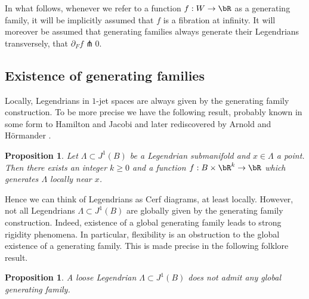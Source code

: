 \documentclass[JEP,XML,SOM,Unicode,NoFloatCountersInSection]{cedram}
\theoremstyle{plain}
\newtheorem{proposition}[theorem]{Proposition}
\theoremstyle{definition}
\begin{document}
In what follows, whenever we refer to a function $f:W \to \bR$ as a generating family, it will be implicitly assumed that $f$ is a fibration at infinity. It will moreover be assumed that generating families always generate their Legendrians transversely, \ie that $\partial_F f \pitchfork 0$.

\subsection{Existence of generating families}

Locally, Legendrians in $1$-jet spaces are always given by the generating family construction. To be more precise we have the following result, probably known in some form to Hamilton and Jacobi and later rediscovered by Arnold and Hörmander \cite{AGV85}.

\begin{proposition}
Let $\Lambda \subset J^1(B)$ be a Legendrian submanifold and $x \in \Lambda$ a point. Then there exists an integer $k \geq 0$ and a function $f: B \times \bR^k \to \bR$ which generates $\Lambda$ locally near $x$.
\end{proposition}

Hence we can think of Legendrians as Cerf diagrams, at least locally. However, not all Legendrians $\Lambda \subset J^1(B)$ are globally given by the generating family construction. Indeed, existence of a global generating family leads to strong rigidity phenomena. In particular, flexibility is an obstruction to the global existence of a generating family. This is made precise in the following folklore result.

\begin{proposition}\label{Proposition: global non-existence} A loose Legendrian $\Lambda \subset J^1(B)$ does not admit any global generating family.
\end{proposition}
\end{document}
